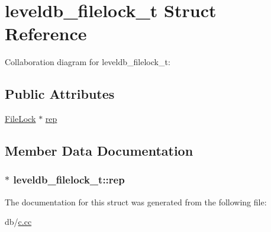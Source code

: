 \hypertarget{structleveldb__filelock__t}{\section{leveldb\-\_\-filelock\-\_\-t Struct Reference}
\label{structleveldb__filelock__t}
}


Collaboration diagram for leveldb\-\_\-filelock\-\_\-t\-:
\subsection*{Public Attributes}
\begin{DoxyCompactItemize}
\item 
\hyperlink{classleveldb_1_1_file_lock}{File\-Lock} $\ast$ \hyperlink{structleveldb__filelock__t_a6c341dd7282427215e6b3ba47871a4f5}{rep}
\end{DoxyCompactItemize}


\subsection{Member Data Documentation}
\hypertarget{structleveldb__filelock__t_a6c341dd7282427215e6b3ba47871a4f5}{
\subsubsection[{rep}]{$\ast$ leveldb\-\_\-filelock\-\_\-t\-::rep}}\label{structleveldb__filelock__t_a6c341dd7282427215e6b3ba47871a4f5}


The documentation for this struct was generated from the following file\-:\begin{DoxyCompactItemize}
\item 
db/\hyperlink{c_8cc}{c.\-cc}\end{DoxyCompactItemize}
